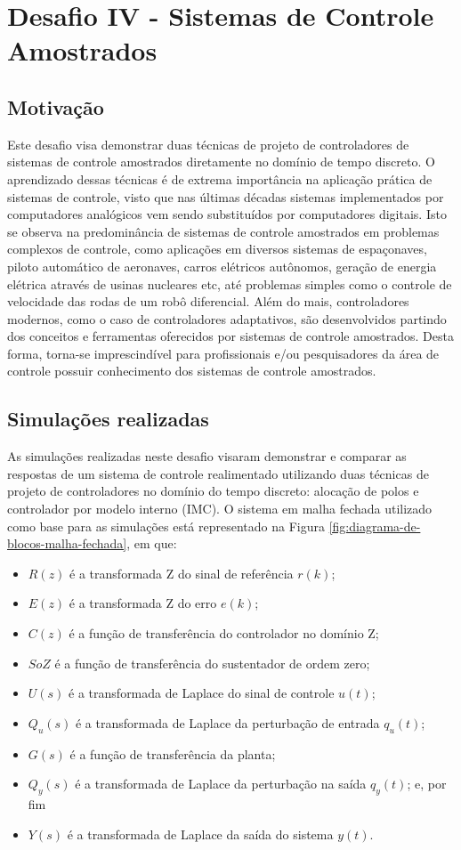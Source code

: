\section{Desafio IV - Sistemas de Controle Amostrados} 

\subsection{Motivação}
Este desafio visa demonstrar duas técnicas de projeto de controladores de
sistemas de controle amostrados diretamente no domínio de tempo discreto. O
aprendizado dessas técnicas é de extrema importância na aplicação prática de
sistemas de controle, visto que nas últimas décadas sistemas implementados por
computadores analógicos vem sendo substituídos por computadores digitais. Isto
se observa na predominância de sistemas de controle amostrados em problemas
complexos de controle, como aplicações em diversos sistemas de espaçonaves,
piloto automático de aeronaves, carros elétricos autônomos, geração de energia
elétrica através de usinas nucleares etc, até problemas simples como o controle
de velocidade das rodas de um robô diferencial. Além do mais, controladores
modernos, como o caso de controladores adaptativos, são desenvolvidos partindo
dos conceitos e ferramentas oferecidos por sistemas de controle amostrados.
Desta forma, torna-se imprescindível para profissionais e/ou pesquisadores da
área de controle possuir conhecimento dos sistemas de controle amostrados.

\subsection{Simulações realizadas}
As simulações realizadas neste desafio visaram demonstrar e comparar as
respostas de um sistema de controle realimentado utilizando duas técnicas de
projeto de controladores no domínio do tempo discreto: alocação de polos e
controlador por modelo interno (IMC). O sistema em malha fechada utilizado como
base para as simulações está representado na Figura
\ref{fig:diagrama-de-blocos-malha-fechada}, em que:

\begin{itemize}
    \item $R(z)$ é a transformada Z do sinal de referência $r(k)$;
    \item $E(z)$ é a transformada Z do erro $e(k)$;
    \item $C(z)$ é a função de transferência do controlador no domínio Z;
    \item $SoZ$ é a função de transferência do sustentador de ordem zero;
    \item $U(s)$ é a transformada de Laplace do sinal de controle $u(t)$;
    \item $Q_{u}(s)$ é a transformada de Laplace da perturbação de entrada
    $q_{u}(t)$;
    \item $G(s)$ é a função de transferência da planta;
    \item $Q_{y}(s)$ é a transformada de Laplace da perturbação na saída
    $q_{y}(t)$; e, por fim
    \item $Y(s)$ é a transformada de Laplace da saída do sistema $y(t)$.
\end{itemize}

